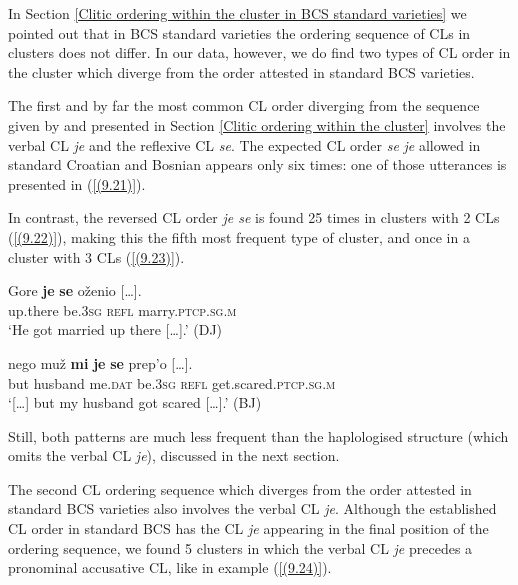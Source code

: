 In Section \ref{Clitic ordering within the cluster in BCS standard varieties} we pointed out that in BCS standard varieties the ordering sequence of CLs in clusters does not differ. In our data, however, we do find two types of CL order in the cluster which diverge from the order attested in standard BCS varieties. 

The first and by far the most common CL order diverging from the sequence given by \citet[29]{FranksKing00} and presented in Section \ref{Clitic ordering within the cluster} involves the verbal CL \textit{je} and the reflexive CL \textit{se}. The expected CL order \textit{se} \textit{je} allowed in standard Croatian and Bosnian appears only six times: one of those utterances is presented in (\ref{(9.21)}).


\noindent In contrast, the reversed CL order \textit{je se} is found 25 times in clusters with 2 CLs (\ref{(9.22)}), making this the fifth most frequent type of cluster, and once in a cluster with 3 CLs (\ref{(9.23)}).

\begin{exe}\ex\label{(9.22)}
\gll Gore \textbf{je} \textbf{se} {oženio  [\dots].} \\
up.there be.3\textsc{sg} \textsc{refl} marry.\textsc{ptcp}.\textsc{sg}.\textsc{m} \\
\glt ‘He got married up there  [\dots].’
\hfill (DJ)

\ex\label{(9.23)}
\gll  [\dots] nego muž \textbf{mi} \textbf{je} \textbf{se} {prep’o  [\dots].}  \\
{} but husband me.\textsc{dat} be.3\textsc{sg} \textsc{refl} get.scared.\textsc{ptcp}.\textsc{sg}.\textsc{m} \\
\glt ‘[\dots] but my husband got scared  [\dots].’
\hfill  (BJ)
\end{exe}

\noindent Still, both patterns are much less frequent than the haplologised structure (which omits the verbal CL \textit{je}), discussed in the next section. 

The second CL ordering sequence which diverges from the order attested in standard BCS varieties also involves the verbal CL \textit{je}. Although the established CL order in standard BCS has the CL \textit{je} appearing in the final position of the ordering sequence, we found 5 clusters in which the verbal CL \textit{je} precedes a pronominal accusative CL, like in example (\ref{(9.24)}).

